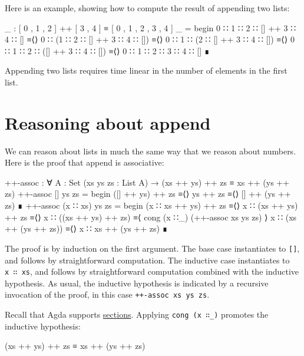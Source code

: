 Here is an example, showing how to compute the result of appending two
lists:

\begin{fence}
\begin{code}
_ : [ 0 , 1 , 2 ] ++ [ 3 , 4 ] ≡ [ 0 , 1 , 2 , 3 , 4 ]
_ =
  begin
    0 ∷ 1 ∷ 2 ∷ [] ++ 3 ∷ 4 ∷ []
  ≡⟨⟩
    0 ∷ (1 ∷ 2 ∷ [] ++ 3 ∷ 4 ∷ [])
  ≡⟨⟩
    0 ∷ 1 ∷ (2 ∷ [] ++ 3 ∷ 4 ∷ [])
  ≡⟨⟩
    0 ∷ 1 ∷ 2 ∷ ([] ++ 3 ∷ 4 ∷ [])
  ≡⟨⟩
    0 ∷ 1 ∷ 2 ∷ 3 ∷ 4 ∷ []
  ∎
\end{code}
\end{fence}

Appending two lists requires time linear in the number of elements in
the first list.

\hypertarget{reasoning-about-append}{%
\section{Reasoning about append}\label{reasoning-about-append}}

We can reason about lists in much the same way that we reason about
numbers. Here is the proof that append is associative:

\begin{fence}
\begin{code}
++-assoc : ∀ {A : Set} (xs ys zs : List A)
  → (xs ++ ys) ++ zs ≡ xs ++ (ys ++ zs)
++-assoc [] ys zs =
  begin
    ([] ++ ys) ++ zs
  ≡⟨⟩
    ys ++ zs
  ≡⟨⟩
    [] ++ (ys ++ zs)
  ∎
++-assoc (x ∷ xs) ys zs =
  begin
    (x ∷ xs ++ ys) ++ zs
  ≡⟨⟩
    x ∷ (xs ++ ys) ++ zs
  ≡⟨⟩
    x ∷ ((xs ++ ys) ++ zs)
  ≡⟨ cong (x ∷_) (++-assoc xs ys zs) ⟩
    x ∷ (xs ++ (ys ++ zs))
  ≡⟨⟩
    x ∷ xs ++ (ys ++ zs)
  ∎
\end{code}
\end{fence}

The proof is by induction on the first argument. The base case
instantiates to \texttt{{[}{]}}, and follows by straightforward
computation. The inductive case instantiates to \texttt{x\ ∷\ xs}, and
follows by straightforward computation combined with the inductive
hypothesis. As usual, the inductive hypothesis is indicated by a
recursive invocation of the proof, in this case
\texttt{++-assoc\ xs\ ys\ zs}.

Recall that Agda supports
\protect\hyperlink{Induction-sections}{sections}. Applying
\texttt{cong\ (x\ ∷\_)} promotes the inductive hypothesis:

\begin{myDisplay}
(xs ++ ys) ++ zs ≡ xs ++ (ys ++ zs)
\end{myDisplay}

